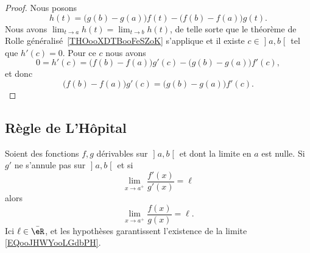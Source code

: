 \begin{proof}
	Nous posons
	\begin{equation}
		h(t)=\big( g(b)-g(a) \big)f(t)-\big( f(b)-f(a) \big)g(t).
	\end{equation}
	Nous avons \( \lim_{t\to a} h(t)=\lim_{t\to b} h(t)\), de telle sorte que le théorème de Rolle généralisé~\ref{THOooXDTBooFeSZoK} s'applique et il existe \( c\in \mathopen] a , b \mathclose[\) tel que \( h'(c)=0\). Pour ce \( c\) nous avons
	\begin{equation}
		0=h'(c)=\big( f(b)-f(a) \big)g'(c)-\big( g(b)-g(a) \big)f'(c),
	\end{equation}
	et donc
	\begin{equation}
		\big( f(b)-f(a) \big)g'(c)=\big( g(b)-g(a) \big)f'(c).
	\end{equation}
\end{proof}

\subsection{Règle de L'Hôpital}

\begin{proposition}     \label{PROPooBZHTooHmyGsy}
	Soient des fonctions \( f,g\) dérivables sur \( \mathopen] a , b \mathclose[\) et dont la limite en \( a\) est nulle. Si \( g'\) ne s'annule pas sur \( \mathopen] a , b \mathclose[\) et si
	\begin{equation}
		\lim_{x\to a^+} \frac{ f'(x) }{ g'(x) }=\ell
	\end{equation}
	alors
	\begin{equation}        \label{EQooJHWYooLGdbPH}
		\lim_{x\to a^+} \frac{ f(x) }{ g(x) }=\ell.
	\end{equation}
	Ici \( \ell\in \bar \eR\), et les hypothèses garantissent l'existence de la limite \eqref{EQooJHWYooLGdbPH}.
\end{proposition}

